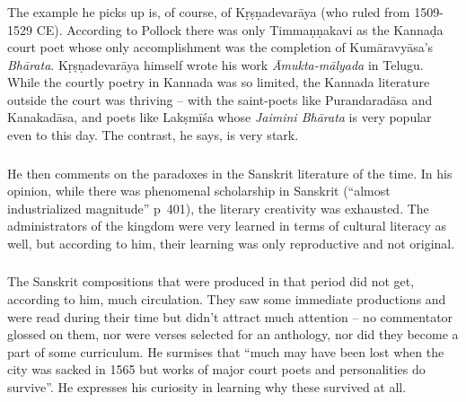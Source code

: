 \subsubsection{} The example he picks up is, of course, of Kṛṣṇadevarāya (who ruled from 1509-1529 CE). According to Pollock there was only Timmaṇṇakavi as the Kannaḍa court poet whose only accomplishment was the completion of Kumāravyāsa’s {\sl Bhārata}. Kṛṣṇadevarāya himself wrote his work {\sl Āmukta-mālyada} in Telugu. While the courtly poetry in Kannada was so limited, the Kannada literature outside the court was thriving – with the saint-poets like Purandaradāsa and Kanakadāsa, and poets like Lakṣmīśa whose {\sl Jaimini Bhārata} is very popular even to this day. The contrast, he says, is very stark.
\vskip 1.5pt

\subsubsection{} He then comments on the paradoxes in the Sanskrit literature of the time. In his opinion, while there was phenomenal scholarship in Sanskrit (“almost industrialized magnitude” p~401), the literary creativity was exhausted. The administrators of the kingdom were very learned in terms of cultural literacy as well, but according to him, their learning was only reproductive and not original.
\vskip 1.5pt

\subsubsection{} The Sanskrit compositions that were produced in that period did not get, according to him, much circulation. They saw some immediate productions and were read during their time but didn’t attract much attention – no commentator glossed on them, nor were verses selected for an anthology, nor did they become a part of some curriculum. He surmises that “much may have been lost when the city was sacked in 1565 but works of major court poets and personalities do survive”. He expresses his curiosity in learning why these survived at all.
\vskip 1.5pt

